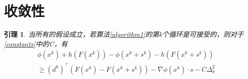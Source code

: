 \documentclass[macfonts]{njuthesis}
\newtheorem{lem}[thm]{引理}
\begin{document}
\section{收敛性}
\begin{lem}
\label{acciterdecrease}
当所有的假设成立，若算法\ref{algorithm1}的第k个循环是可接受的，则对于\ref{constants}中的C，有
\begin{equation}
\label{iterationdecrease}
\begin{aligned}
\phi(x^k) +h(F(x^{k}))-\phi(x^k+s^k)-h(F(x^{k}+s^{k})) \\ \geq\left(d^{k}\right)^{\top}\left(F(x^{k})-F(x^{k}+s^{k})\right)-\nabla\phi(x^k)\cdot s-C \Delta_{k}^{2}
\end{aligned}
\end{equation}
\end{lem}
\end{document}
